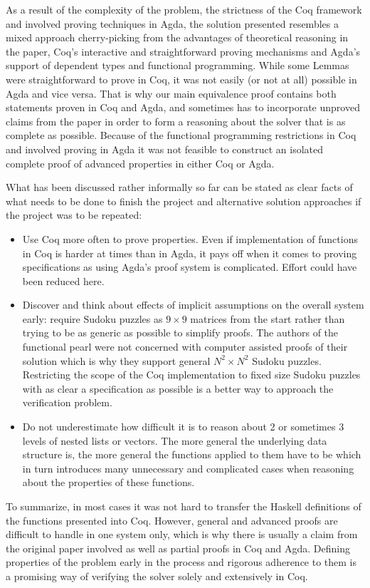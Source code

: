 \documentclass[a4paper,11pt]{article}
\begin{document}
As a result of the complexity of the problem, the strictness of the Coq framework and involved proving techniques in Agda, the solution presented resembles a mixed approach cherry-picking from the advantages of theoretical reasoning in the paper, Coq's interactive and straightforward proving mechanisms and Agda's support of dependent types and functional programming. While some Lemmas were straightforward to prove in Coq, it was not easily (or not at all) possible in Agda and vice versa. That is why our main equivalence proof contains both statements proven in Coq and Agda, and sometimes has to incorporate unproved claims from the paper in order to form a reasoning about the solver that is as complete as possible. Because of the functional programming restrictions in Coq and involved proving in Agda it was not feasible to construct an isolated complete proof of advanced properties in either Coq or Agda.

What has been discussed rather informally so far can be stated as clear facts of what needs to be done to finish the project and alternative solution approaches if the project was to be repeated:
\begin{itemize}
  \item Use Coq more often to prove properties. Even if implementation of functions in Coq is harder at times than in Agda, it pays off when it comes to proving specifications as using Agda's proof system is complicated. Effort could have been reduced here. 
  \item Discover and think about effects of implicit assumptions on the overall system early: require Sudoku puzzles as \(9 \times 9\) matrices from the start rather than trying to be as generic as possible to simplify proofs. The authors of the functional pearl were not concerned with computer assisted proofs of their solution which is why they support general \(N^2 \times N^2\) Sudoku puzzles. Restricting the scope of the Coq implementation to fixed size Sudoku puzzles with as clear a specification as possible is a better way to approach the verification problem.
  \item Do not underestimate how difficult it is to reason about 2 or sometimes 3 levels of nested lists or vectors. The more general the underlying data structure is, the more general the functions applied to them have to be which in turn introduces many unnecessary and complicated cases when reasoning about the properties of these functions.
\end{itemize}

To summarize, in most cases it was not hard to transfer the Haskell definitions of the functions presented into Coq. However, general and advanced proofs are difficult to handle in one system only, which is why there is usually a claim from the original paper involved as well as partial proofs in Coq and Agda. Defining properties of the problem early in the process and rigorous adherence to them is a promising way of verifying the solver solely and extensively in Coq.
\end{document}
